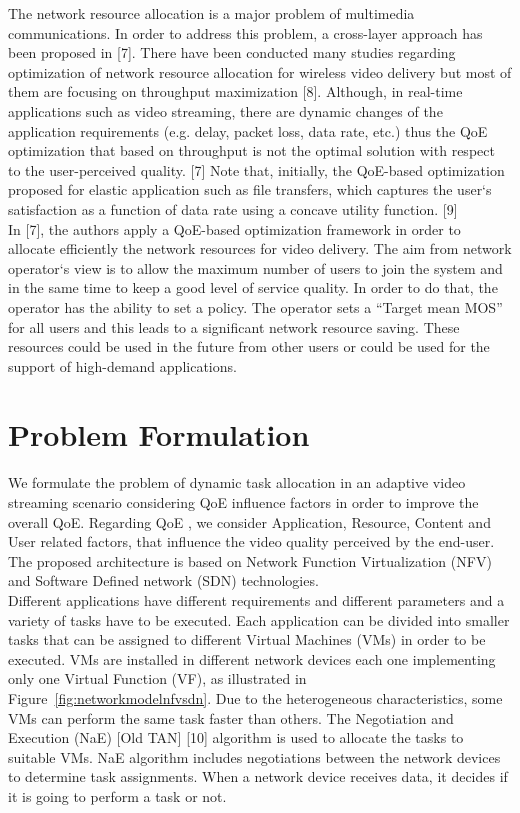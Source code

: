 \documentclass[a4paper]{article}
\begin{document}
 The network resource allocation is a major problem of multimedia communications. In order to address this problem, a cross-layer approach has been proposed in [7]. There have been conducted many studies regarding optimization of network resource allocation for wireless video delivery but most of them are focusing on throughput maximization [8]. Although, in real-time applications such as video streaming, there are dynamic changes of the application requirements (e.g. delay, packet loss, data rate, etc.) thus the QoE optimization that based on throughput is not the optimal solution with respect to the user-perceived quality. [7] Note that, initially, the QoE-based optimization proposed for elastic application such as file transfers, which captures the user`s satisfaction as a function of data rate using a concave utility function. [9]\\

In [7], the authors apply a QoE-based optimization framework in order to allocate efficiently the network resources for video delivery. The aim from network operator`s view is to allow the maximum number of users to join the system and in the same time to keep a good level of service quality. In order to do that, the operator has the ability to set a policy. The operator sets a “Target mean MOS” for all users and this leads to a significant network resource saving. These resources could be used in the future from other users or could be used for the support of high-demand applications. \\


\section{Problem Formulation}
We formulate the problem of dynamic task allocation in an adaptive video streaming scenario considering QoE influence factors in order to improve the overall QoE. Regarding QoE , we consider Application, Resource, Content and User related factors, that influence the video quality perceived by the end-user.  The proposed architecture is based on Network Function Virtualization (NFV) and Software Defined network (SDN) technologies. \\

Different applications have different requirements and different parameters and a variety of tasks have to be executed. Each application can be divided into smaller tasks that can be assigned to different Virtual Machines (VMs) in order to be executed. VMs are installed in different network devices each one implementing only one Virtual Function (VF), as illustrated in Figure~\ref{fig:networkmodelnfvsdn}.
Due to the heterogeneous characteristics, some VMs can perform the same task faster than others. The Negotiation and Execution (NaE) [Old TAN] [10] algorithm is used to allocate the tasks to suitable VMs. NaE algorithm includes negotiations between the network devices to determine task assignments. When a network device receives data, it decides if it is going to perform a task or not. \\
\end{document}
